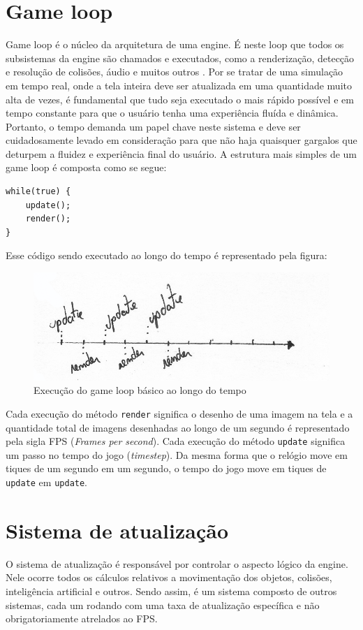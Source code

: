 \documentclass[12pt, 
openright, 
oneside, 
a4paper,    
brazil]{facom-ufu-abntex2}
\begin{document}
\section{Game loop}
Game loop é o núcleo da arquitetura de uma engine. É neste loop que todos os subsistemas da engine são chamados e  executados, como a renderização, detecção e resolução de colisões, áudio e muitos outros \cite{GameEngineArchitecture}. Por se tratar de uma simulação em tempo real, onde a tela inteira deve ser atualizada em uma quantidade muito alta de vezes, é fundamental que tudo seja executado o mais rápido possível e em tempo constante para que o usuário tenha uma experiência fluída e dinâmica.\\
Portanto, o tempo demanda um papel chave neste sistema e deve ser cuidadosamente levado em consideração para que não haja quaisquer gargalos que deturpem a fluidez e experiência final do usuário. A estrutura mais simples de um game loop é composta como se segue:\\

\begin{lstlisting}[caption=Estrutura básica do Game Loop]
while(true) {
	update();
	render();
}
\end{lstlisting}
Esse código sendo executado ao longo do tempo é representado pela figura:
\begin{figure}[H]
	\centering
	\includegraphics[width=\textwidth]{imagens/ilu1.png}
	\caption{Execução do game loop básico ao longo do tempo}
\end{figure}

Cada execução do método \texttt{render} significa o desenho de uma imagem na tela e a quantidade total de imagens desenhadas ao longo de um segundo é representado pela sigla FPS (\textit{Frames per second}). Cada execução do método \texttt{update} significa um passo no tempo do jogo (\textit{timestep}). Da mesma forma que o relógio move em tiques de um segundo em um segundo, o tempo do jogo move em tiques de \texttt{update} em \texttt{update}.


\section{Sistema de atualização}
O sistema de atualização é responsável por controlar o aspecto lógico da engine. Nele ocorre todos os cálculos relativos a movimentação dos objetos, colisões, inteligência artificial e outros. Sendo assim, é um sistema composto de outros sistemas, cada um rodando com uma taxa de atualização específica e não obrigatoriamente atrelados ao FPS.
\end{document}
